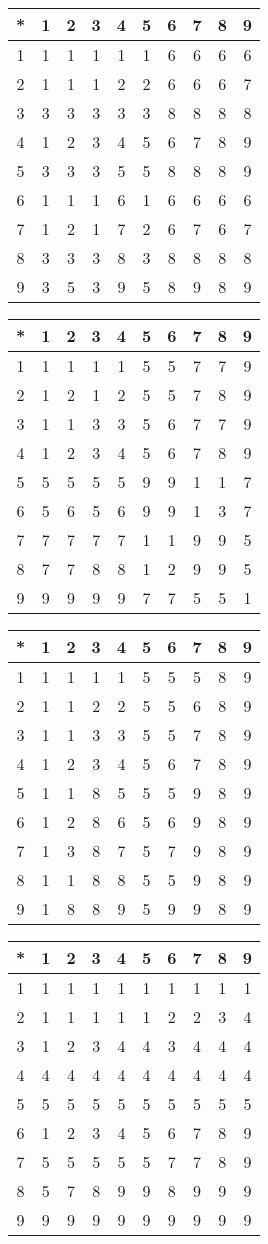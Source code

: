 \begin{tabular}[t]{c|ccccccccc}
*&1&2&3&4&5&6&7&8&9 \\ \hline
    1&1&1&1&1&1&6&6&6&6 \\
    2&1&1&1&2&2&6&6&6&7 \\
    3&3&3&3&3&3&8&8&8&8 \\
    4&1&2&3&4&5&6&7&8&9 \\
    5&3&3&3&5&5&8&8&8&9 \\
    6&1&1&1&6&1&6&6&6&6 \\
    7&1&2&1&7&2&6&7&6&7 \\
    8&3&3&3&8&3&8&8&8&8 \\
    9&3&5&3&9&5&8&9&8&9 
\end{tabular}


\begin{tabular}[t]{c|ccccccccc}
*&1&2&3&4&5&6&7&8&9 \\ \hline
    1&1&1&1&1&5&5&7&7&9 \\
    2&1&2&1&2&5&5&7&8&9 \\
    3&1&1&3&3&5&6&7&7&9 \\
    4&1&2&3&4&5&6&7&8&9 \\
    5&5&5&5&5&9&9&1&1&7 \\
    6&5&6&5&6&9&9&1&3&7 \\
    7&7&7&7&7&1&1&9&9&5 \\
    8&7&7&8&8&1&2&9&9&5 \\
    9&9&9&9&9&7&7&5&5&1 
\end{tabular}


\begin{tabular}[t]{c|ccccccccc}
*&1&2&3&4&5&6&7&8&9 \\ \hline
    1&1&1&1&1&5&5&5&8&9 \\
    2&1&1&2&2&5&5&6&8&9 \\
    3&1&1&3&3&5&5&7&8&9 \\
    4&1&2&3&4&5&6&7&8&9 \\
    5&1&1&8&5&5&5&9&8&9 \\
    6&1&2&8&6&5&6&9&8&9 \\
    7&1&3&8&7&5&7&9&8&9 \\
    8&1&1&8&8&5&5&9&8&9 \\
    9&1&8&8&9&5&9&9&8&9 
\end{tabular}


\begin{tabular}[t]{c|ccccccccc}
*&1&2&3&4&5&6&7&8&9 \\ \hline
    1&1&1&1&1&1&1&1&1&1 \\
    2&1&1&1&1&1&2&2&3&4 \\
    3&1&2&3&4&4&3&4&4&4 \\
    4&4&4&4&4&4&4&4&4&4 \\
    5&5&5&5&5&5&5&5&5&5 \\
    6&1&2&3&4&5&6&7&8&9 \\
    7&5&5&5&5&5&7&7&8&9 \\
    8&5&7&8&9&9&8&9&9&9 \\
    9&9&9&9&9&9&9&9&9&9 
\end{tabular}


